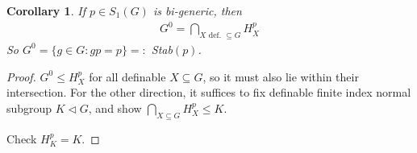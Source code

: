 \documentclass[]{article}
\theoremstyle{custhm}
\theoremstyle{cusdef}
\theoremstyle{custhm}
\theoremstyle{custhm}
\newtheorem{cor}[theorem]{Corollary}
\theoremstyle{custhm}
\theoremstyle{ex}
\theoremstyle{custhm}
\theoremstyle{cusdef}
\theoremstyle{remark}
\theoremstyle{remark}
\theoremstyle{numremark}
\begin{document}
\begin{cor}
	If $p \in S_1(G)$ is bi-generic, then
	\begin{align*}
		G^0 = \bigcap_{X\textrm{ def. }\subseteq G}H^p_X
	\end{align*}
	So $G^0 = \{g\in G: gp = p\}=:$ \emph{Stab}$(p)$.
\end{cor}
\begin{proof}
	$G^0 \le H^p_X$ for all definable $X\subseteq G$, so it must also lie within their intersection. For the other direction, it suffices to fix definable finite index normal subgroup $K\triangleleft G$, and show $\bigcap_{X\subseteq G}H^p_X \le K$.

	Check $H^p_K = K$.
\end{proof}
\end{document}
